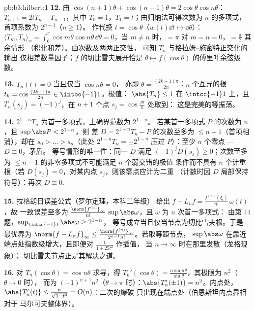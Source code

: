 \begin{solution}{pb:b3:hilbert:1}
\textbf{12.} 由 $\cos(n{+}1)\theta + \cos(n{-}1)\theta =
2\cos\theta\cos n\theta$：$T_{n+1} = 2tT_n - T_{n-1}$，其中
$T_0 = 1$，$T_1 = t$；由归纳法可得次数为
$n$ 的多项式，首项系数为 $2^{n-1}$（$n \geq 1$）。
作代换 $t = \cos\theta$（$w(t)\dd t \mapsto
\dd\theta$）：$\langle T_m, T_n\rangle_w =
\int_0^\pi\cos m\theta\cos n\theta\,\dd\theta = 0$，当 $m
\neq n$ 时，$= \pi$ 对 $m = n = 0$，$= \frac\pi2$ 其余情形
（积化和差）。由次数及两两正交性，
可知 $T_n$ 与格拉姆--施密特正交化的输出
仅相差数量因子；$f$ 的切比雪夫展开恰是
$\theta \mapsto f(\cos\theta)$ 的傅里叶余弦级数。

\textbf{13.} $T_n(t) = 0$ 当且仅当 $\cos n\theta = 0$，
亦即 $\theta = \frac{(2k-1)\pi}{2n}$：$n$ 个互异的根
$t_k = \cos\frac{(2k-1)\pi}{2n} \in \intoo{-1}1$。极值：
$\abs{T_n} \leq 1$ 在 $\intcc{-1}1$ 上，且 $T_n(s_j) =
(-1)^j$，在 $n + 1$ 个点 $s_j = \cos\frac{j\pi}n$ 处取到：
这是完美的等振荡。

\textbf{14.} $2^{1-n}T_n$ 为首一多项式，上确界范数为 $2^{1-n}$。
若某首一多项式 $P$ 的次数为 $n$，且 $\sup\abs P < 2^{1-n}$，则
差 $D = 2^{1-n}T_n - P$ 的次数至多为 $\leq n -
1$（首项相消），却在 $s_0 >
\dots > s_n$（此处 $2^{1-n}T_n = \pm2^{1-n}$ 压过
$P$）：至少 $n$ 个零点 --- $D \equiv 0$，矛盾。
等号情形的唯一性：同一 $D$ 满足
$(-1)^jD(s_j) \geq 0$；次数至多为 $\leq
n-1$ 的非零多项式不可能满足 $n$ 个弱交错的极值
条件而不具有 $n$ 个计重根（若
$D(s_j) = 0$，对某内点 $s_j$，则该零点应计为二重
（计数时因 $D$ 局部保持符号）：再次 $D
\equiv 0$.

\textbf{15.} 拉格朗日误差公式（罗尔定理，本科二年级）
给出 $f - L_nf = \frac{f^{(n)}(\xi_t)}{n!}\,\omega(t)$，故
一致误差至多为 $\frac{\norm{f^{(n)}}_\infty}
{n!}\,\sup\abs\omega$，且 $\omega$ 为 $n$ 次首一多项式：
由第 14 题，$\sup_{\intcc{-1}1}\abs\omega \geq 2^{1-n}$，
等号成立当且仅当节点为切比雪夫根。于是
最优界为 $\norm{f - L_nf}_\infty \leq
\frac{\norm{f^{(n)}}_\infty}{2^{n-1}n!}$。若取等距节点，
$\sup\abs\omega$ 在靠近
端点处指数级增大，且即便对 $\frac1{1 + 25t^2}$ 作插值，
当 $n \to \infty$ 时在那里发散（龙格现象）；
切比雪夫节点正是其解决之道。

\textbf{16.} 对 $T_n(\cos\theta) = \cos
n\theta$ 求导，得 $T_n'(\cos\theta) = \frac{n\sin n\theta}
{\sin\theta}$，其极限为 $n^2$（$\theta \to 0$ 时），
而为 $(-1)^{n+1}n^2$（$\theta \to \pi$ 时）：$\abs{T_n'(\pm1)} =
n^2$。内点处，$\abs{T_n'(t)} \leq
\frac{n}{\sqrt{1 - t^2}} = O(n)$：二次的爆破
只出现在端点处（伯恩斯坦内点界相对于
马尔可夫整体界）。


\end{solution}
